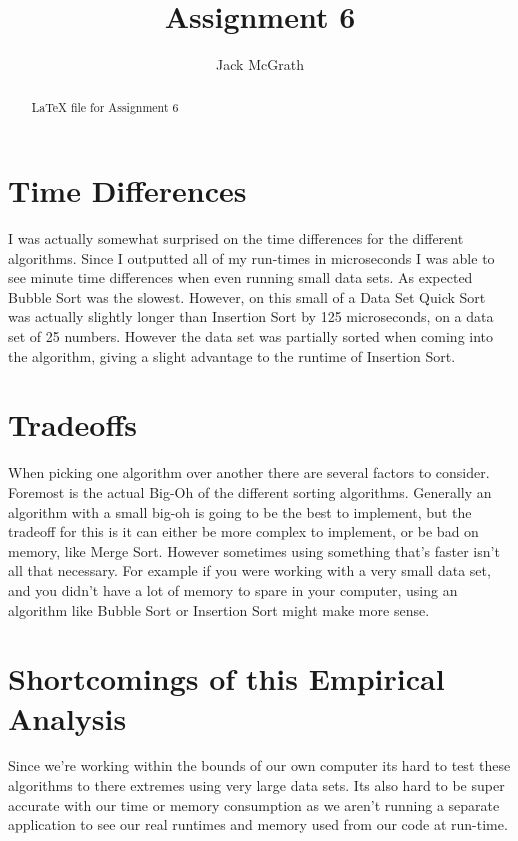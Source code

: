 \documentclass{article}
\begin{document}
\title{Assignment 6}
\author{Jack McGrath}

\maketitle

\begin{abstract}
LaTeX file for Assignment 6
\end{abstract}

\section{Time Differences}
I was actually somewhat surprised on the time differences for the different algorithms. Since I outputted all of my run-times in microseconds I was able to see minute time differences when even running small data sets. As expected Bubble Sort was the slowest. However, on this small of a Data Set Quick Sort was actually slightly longer than Insertion Sort by 125 microseconds, on a data set of 25 numbers. However the data set was partially sorted when coming into the algorithm, giving a slight advantage to the runtime of Insertion Sort.

\section{Tradeoffs}
When picking one algorithm over another there are several factors to consider. Foremost is the actual Big-Oh of the different sorting algorithms. Generally an algorithm with a small big-oh is going to be the best to implement, but the tradeoff for this is it can either be more complex to implement, or be bad on memory, like Merge Sort. However sometimes using something that's faster isn't all that necessary. For example if you were working with a very small data set, and you didn't have a lot of memory to spare in your computer, using an algorithm like Bubble Sort or Insertion Sort might make more sense.


\section{Shortcomings of this Empirical Analysis}
Since we're working within the bounds of our own computer its hard to test these algorithms to there extremes using very large data sets. Its also hard to be super accurate with our time or memory consumption as we aren't running a separate application to see our real runtimes and memory used from our code at run-time.
\end{document}
